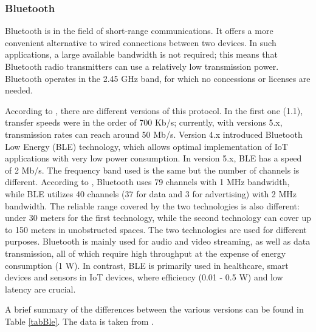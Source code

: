 \documentclass[english]{article}
\newcounter{subsubsubsection}[subsubsection]
\begin{document}
\subsubsection{Bluetooth}
Bluetooth is in the field of short-range communications. It offers a more convenient alternative to wired connections between two devices. In such applications, a large available bandwidth is not required; this means that Bluetooth radio transmitters can use a relatively low transmission power. Bluetooth operates in the 2.45 GHz band, for which no concessions or licenses are needed.

According to \cite{Transmission}, there are different versions of this protocol. In the first one (1.1), transfer speeds were in the order of 700 Kb/s; currently, with versions 5.x, transmission rates can reach around 50 Mb/s. Version 4.x introduced Bluetooth Low Energy (BLE) technology, which allows optimal implementation of IoT applications with very low power consumption. In version 5.x, BLE has a speed of 2 Mb/s. The frequency band used is the same but the number of channels is different. According to \cite{blee}, Bluetooth uses 79 channels with 1 MHz bandwidth, while BLE utilizes 40 channels (37 for data and 3 for advertising) with 2 MHz bandwidth. The reliable range covered by the two technologies is also different: under 30 meters for the first technology, while the second technology can cover up to 150 meters in unobstructed spaces.
The two technologies are used for different purposes. Bluetooth is mainly used for audio and video streaming, as well as data transmission, all of which require high throughput at the expense of energy consumption (1 W). In contrast, BLE is primarily used in healthcare, smart devices and sensors in IoT devices, where efficiency (0.01 - 0.5 W) and low latency are crucial.

A brief summary of the differences between the various versions can be found in Table \ref{tabBle}. The data is taken from \cite{G_2023,matlab}.
\end{document}
